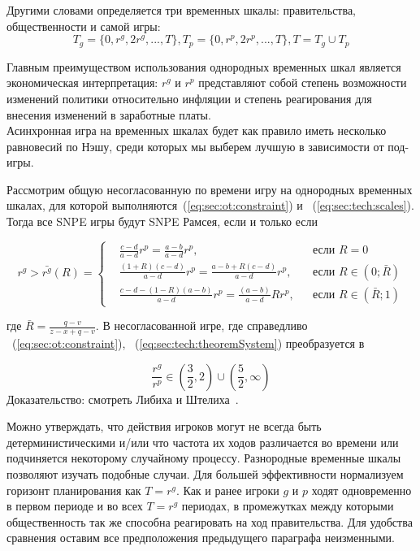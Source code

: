Другими словами определяется три временных шкалы: правительства, общественности и самой игры:
\begin{equation}
\label{eq:sec:tech:scales}
T_g = \{0,r^g,2r^g,...,T\}, T_p=\{0,r^p,2r^p,...,T\}, T=T_g\cup T_p 
\end{equation}

Главным преимуществом использования однородных временных шкал является экономическая интерпретация: $r^g$ и $r^p$ представляют собой степень возможности изменений политики относительно инфляции и степень реагирования для внесения изменений в заработные платы.
\\

Асинхронная игра на временных шкалах будет как правило иметь несколько равновесий по Нэшу, среди которых мы выберем лучшую в зависимости от под-игры.

\begin{theorem}
	Рассмотрим общую несогласованную по времени игру на однородных временных шкалах, для которой выполняются~(\ref{eq:sec:ot:constraint}) и ~(\ref{eq:sec:tech:scales}). Тогда все SNPE игры будут SNPE Рамсея, если и только если
	
	\begin{equation}
	\label{eq:sec:tech:theoremSystem}
	r^g> \bar{r^g}(R) = \left\{ 
	\begin{aligned} 
	&\frac{c - d}{a-d}r^p= \frac{a-b}{a-d}r^p, &&\text{если } R=0
	\\
	&\frac{(1+R)(c-d)}{a-d}r^p= \frac{a-b + R(c-d)}{a-d}r^p, &&\text{если } 	R\in(0; \bar{R})
	\\
	&\frac{c-d-(1-R)(a-b)}{a-d}r^p= \frac{(a-b)}{a-d}Rr^p, &&\text{если } 	R\in(\bar{R};1)
	\end{aligned}
	\right.		
	\end{equation}
\end{theorem}
где $\bar{R}=\frac{q-v}{z-x+q-v}$. В несогласованной игре, где справедливо ~(\ref{eq:sec:ot:constraint}),  ~(\ref{eq:sec:tech:theoremSystem}) преобразуется в 

\begin{equation}
\frac{r^g}{r^p} \in \left(\frac{3}{2}, 2\right)\cup \left(\frac{5}{2}, \infty\right)
\end{equation}
Доказательство: смотреть Либиха и Штелиха~\cite{libichIncorpo}.


Можно утверждать, что действия игроков могут не всегда быть детерминистическими и/или что частота их ходов различается во времени или подчиняется некоторому случайному процессу. Разнородные временные шкалы позволяют изучать подобные случаи. Для большей эффективности нормализуем горизонт планирования как $T = r^g$. Как и ранее игроки $g$ и $p$ ходят одновременно в первом периоде и во всех $T = r^g$ периодах, в промежутках между которыми общественность так же способна реагировать на ход правительства. Для удобства сравнения оставим все предположения предыдущего параграфа неизменными.

